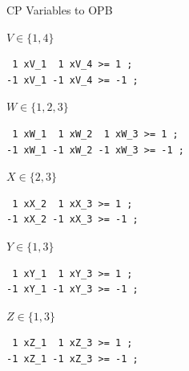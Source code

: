 \documentclass{beamer}
\begin{document}
\begin{frame}[fragile]{CP Variables to OPB}
    \begin{minipage}[t]{0.20\framewidth}
        $V \in \{ 1, 4 \}$
    \end{minipage}\hfill\begin{minipage}[c]{0.70\framewidth}
    \begin{lstlisting}
 1 xV_1  1 xV_4 >= 1 ;
-1 xV_1 -1 xV_4 >= -1 ;
    \end{lstlisting}
    \end{minipage}

    \begin{minipage}[t]{0.20\framewidth}
        $W \in \{ 1, 2, 3 \}$
    \end{minipage}\hfill\begin{minipage}[c]{0.70\framewidth}
    \begin{lstlisting}
 1 xW_1  1 xW_2  1 xW_3 >= 1 ;
-1 xW_1 -1 xW_2 -1 xW_3 >= -1 ;
    \end{lstlisting}
    \end{minipage}

    \begin{minipage}[t]{0.20\framewidth}
        $X \in \{ 2, 3 \}$
    \end{minipage}\hfill\begin{minipage}[c]{0.70\framewidth}
    \begin{lstlisting}
 1 xX_2  1 xX_3 >= 1 ;
-1 xX_2 -1 xX_3 >= -1 ;
    \end{lstlisting}
    \end{minipage}

    \begin{minipage}[t]{0.20\framewidth}
        $Y \in \{ 1, 3 \}$
    \end{minipage}\hfill\begin{minipage}[c]{0.70\framewidth}
    \begin{lstlisting}
 1 xY_1  1 xY_3 >= 1 ;
-1 xY_1 -1 xY_3 >= -1 ;
    \end{lstlisting}
    \end{minipage}

    \begin{minipage}[t]{0.20\framewidth}
        $Z \in \{ 1, 3 \}$
    \end{minipage}\hfill\begin{minipage}[c]{0.70\framewidth}
    \begin{lstlisting}
 1 xZ_1  1 xZ_3 >= 1 ;
-1 xZ_1 -1 xZ_3 >= -1 ;
    \end{lstlisting}
    \end{minipage}
\end{frame}
\end{document}
